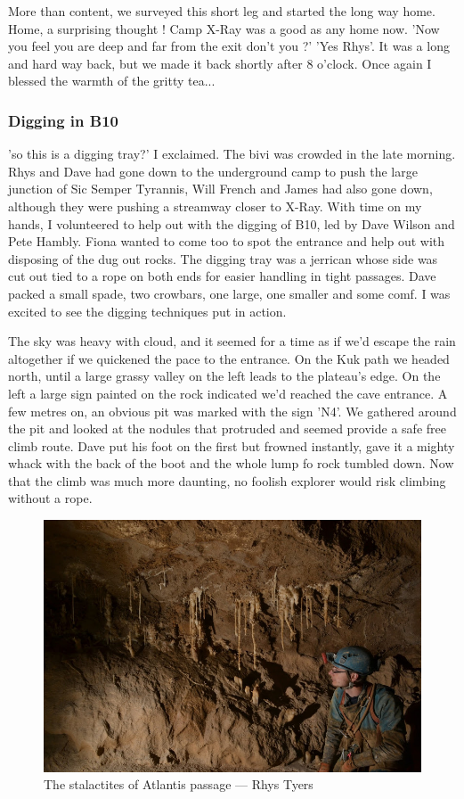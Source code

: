\documentclass[onecolumn]{book}
\begin{document}
More than content, we surveyed this short leg and started the long way home. Home, a surprising thought ! Camp X-Ray was a good as any home now. 'Now you feel you are deep and far from the exit don't you ?' 'Yes Rhys'. It was a long and hard way back, but we made it back shortly after 8 o'clock. Once again I blessed the warmth of the gritty tea...



\subsubsection{Digging in B10}
'so this is a digging tray?' I exclaimed. The bivi was crowded in the late morning. Rhys and Dave had gone down to the underground camp to push the large junction of Sic Semper Tyrannis, Will French and James had also gone down, although they were pushing a streamway closer to X-Ray. With time on my hands, I volunteered to help out with the digging of B10, led by Dave Wilson and Pete Hambly. Fiona wanted to come too to spot the entrance and help out with disposing of the dug out rocks. The digging tray was a jerrican whose side was cut out tied to a rope on both ends for easier handling in tight passages. Dave packed a small spade, two crowbars, one large, one smaller and some comf. I was excited to see the digging techniques put in action.

The sky was heavy with cloud, and it seemed for a time as if we'd escape the rain altogether if we quickened the pace to the entrance. On the Kuk path we headed north, until a large grassy valley on the left leads to the plateau's edge. On the left a large sign painted on the rock indicated we'd reached the cave entrance. A few metres on, an obvious pit was marked with the sign 'N4'.  We gathered around the pit and looked at the nodules that protruded and seemed provide a safe free climb route. Dave put his foot on the first but frowned instantly, gave it a mighty whack with the back of the boot and the whole lump fo rock tumbled down. Now that the climb was much more daunting, no foolish explorer would risk climbing without a rope.

\begin{figure}[h]
\centering
\includegraphics[width=\textwidth]{Atlantix.jpg}
\caption{The stalactites of Atlantis passage --- Rhys Tyers}
\label{stalactites Atlantis}
\end{figure}
\end{document}
